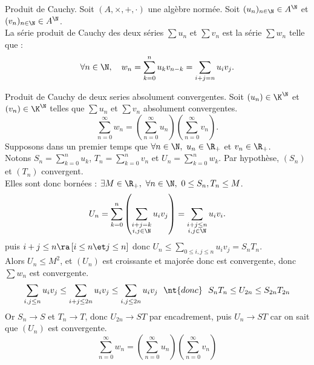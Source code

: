 \documentclass[11pt]{article}
\begin{document}
\begin{defi}{Produit de Cauchy.}{}
    Soit $(A,\times,+,\cdot)$ une algèbre normée. Soit $(u_n)_{n\in\N}\in A^\N$ et $(v_n)_{n\in\N}\in A^\N$.\\
    La série produit de Cauchy des deux séries $\sum u_n$ et $\sum v_n$ est la série $\sum w_n$ telle que :
    \begin{equation*}
        \forall n \in \N, \quad w_n = \sum_{k=0}^nu_kv_{n-k}=\sum_{i+j=n}u_iv_j.
    \end{equation*}
\end{defi}

\begin{prop}{Produit de Cauchy de deux series absolument convergentes.}{}
    Soit $(u_n)\in\K^\N$ et $(v_n)\in\K^\N$ telles que $\sum u_n$ et $\sum v_n$ absolument convergentes.
    \begin{equation*}
        \sum_{n=0}^{\infty} w_n = \left( \sum_{n=0}^{\infty} u_n \right) \left( \sum_{n=0}^{\infty} v_n \right).
    \end{equation*}
    \tcblower
    Supposons dans un premier temps que $\forall n \in \N, ~ u_n \in \R_+$ et $v_n\in\R_+$.\\
    Notons $S_n=\sum_{k=0}^n u_k$, $T_n = \sum_{k=0}^n v_n$ et $U_n = \sum_{k=0}^n w_k$. Par hypothèse, $(S_n)$ et $(T_n)$ convergent.\\
    Elles sont donc bornées : $\exists M \in \R_+, ~ \forall n \in \N, ~ 0 \leq S_n, T_n \leq M$.
    \begin{equation*}
        U_n = \sum_{k=0}^n\left( \sum_{\substack{i+j=k\\i,j\in\N}} u_iv_j \right)=\sum_{\substack{i+j\leq n\\i,j\in\N}}u_iv_i.
    \end{equation*}
    puis $i+j\leq n \ra \left[ i \leq n \et j \leq n \right]$ donc $U_n \leq \sum_{0\leq i,j \leq n}u_iv_j=S_nT_n$.\\
    Alors $U_n \leq M^2$, et $(U_n)$ est croissante et majorée donc est convergente, donc $\sum w_n$ est convergente.
    \begin{equation*}
        \sum_{i,j\leq n}u_i v_j \leq \sum_{i+j\leq 2n}u_iv_j \leq \sum_{i,j\leq 2n}u_iv_j ~~\nt{donc}~~ S_nT_n \leq U_{2n} \leq S_{2n}T_{2n}
    \end{equation*}
    Or $S_n\to S$ et $T_n\to T$, donc $U_{2n}\to ST$ par encadrement, puis $U_n\to ST$ car on sait que $(U_n)$ est convergente.
    \begin{equation*}
        \sum_{n=0}^\infty w_n = \left( \sum_{n=0}^\infty u_n \right)\left( \sum_{n=0}^\infty v_n \right)
    \end{equation*}
\end{prop}
\end{document}
